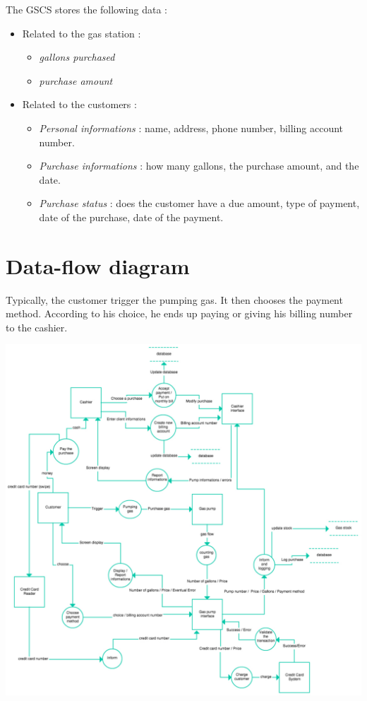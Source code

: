 \documentclass[11pt, a4paper]{article}
\newcommand{\data}[1]{\textit{#1}}
\begin{document}
The GSCS stores the following data :
\begin{itemize}
\item Related to the gas station :
		\begin{itemize}
		\item \data{gallons purchased}
		\item \data{purchase amount}
		\end{itemize}

\item Related to the customers :
		\begin{itemize}
		\item \data{Personal informations} : name, address, phone number, billing account number.
		\item \data{Purchase informations} : how many gallons, the purchase amount, and the date.
		\item \data{Purchase status} : does the customer have a due amount, type of payment, date of the purchase, date of the payment.
		\end{itemize}
\end{itemize}



\section{Data-flow diagram}

Typically, the customer trigger the pumping gas. It then chooses the payment method. According to his choice, he ends up paying or giving his billing number to the cashier.

\begin{center}
\centerline{\includegraphics[width=1.4\textwidth]{dataflow_diagram.pdf}}
\end{center}
\end{document}
